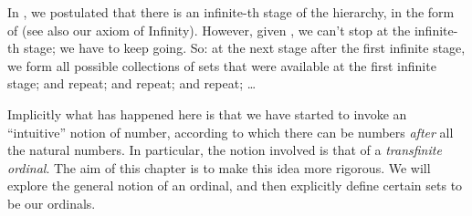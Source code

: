 \documentclass[../../../include/open-logic-section]{subfiles}
\begin{document}


In , we postulated that there is an infinite-th stage
of the hierarchy, in the form of \stagesinf{} (see also our axiom of
Infinity). However, given \stagessucc{}, we can't stop at the
infinite-th stage; we have to keep going. So: at the next stage after
the first infinite stage, we form all possible collections of sets
that were available at the first infinite stage; and repeat; and
repeat; and repeat; \dots

Implicitly what has happened here is that we have started to invoke an
``intuitive'' notion of number, according to which there can be
numbers \emph{after} all the natural numbers. In particular, the
notion involved is that of a \emph{transfinite ordinal}. The aim of
this chapter is to make this idea more rigorous. We will explore the
general notion of an ordinal, and then explicitly define certain sets
to be our ordinals. 
\end{document}
